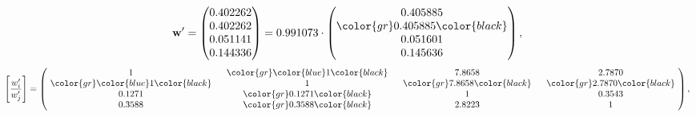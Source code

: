 \begin{example}
\begin{equation*}
\mathbf{w}^{\prime} =
\begin{pmatrix}
0.402262\\
0.402262\\
0.051141\\
0.144336
\end{pmatrix} =
0.991073\cdot
\begin{pmatrix}
0.405885\\
\color{gr} 0.405885\color{black} \\
0.051601\\
0.145636
\end{pmatrix},
\end{equation*}
\begin{equation*}
\left[ \frac{{w}^{\prime}_i}{{w}^{\prime}_j} \right] =
\begin{pmatrix}
$\,\,$ 1 $\,\,$ & $\,\,$\color{gr} \color{blue} 1\color{black} $\,\,$ & $\,\,$7.8658$\,\,$ & $\,\,$2.7870$\,\,$ \\
$\,\,$\color{gr} \color{blue} 1\color{black} $\,\,$ & $\,\,$ 1 $\,\,$ & $\,\,$\color{gr} 7.8658\color{black} $\,\,$ & $\,\,$\color{gr} 2.7870\color{black}   $\,\,$ \\
$\,\,$0.1271$\,\,$ & $\,\,$\color{gr} 0.1271\color{black} $\,\,$ & $\,\,$ 1 $\,\,$ & $\,\,$0.3543 $\,\,$ \\
$\,\,$0.3588$\,\,$ & $\,\,$\color{gr} 0.3588\color{black} $\,\,$ & $\,\,$2.8223$\,\,$ & $\,\,$ 1  $\,\,$ \\
\end{pmatrix},
\end{equation*}
\end{example}
\newpage
